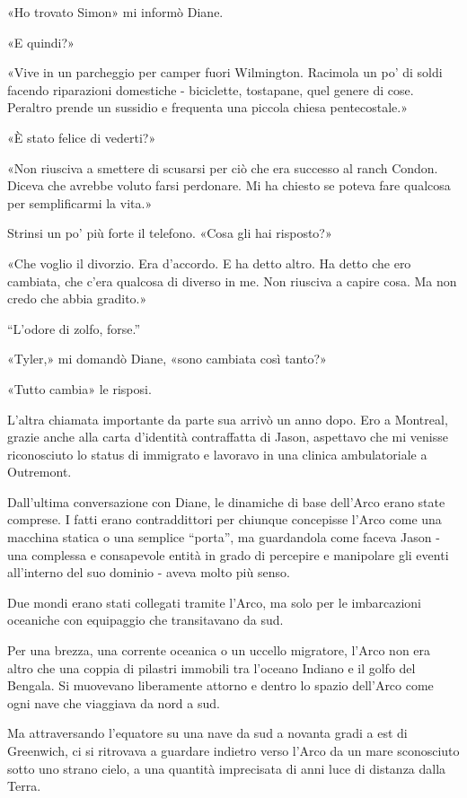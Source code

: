 «Ho trovato Simon» mi informò Diane.

«E quindi?»

«Vive in un parcheggio per camper fuori Wilmington. Racimola un po' di
soldi facendo riparazioni domestiche - biciclette, tostapane, quel
genere di cose. Peraltro prende un sussidio e frequenta una piccola
chiesa pentecostale.»

«È stato felice di vederti?»

«Non riusciva a smettere di scusarsi per ciò che era successo al ranch
Condon. Diceva che avrebbe voluto farsi perdonare. Mi ha chiesto se
poteva fare qualcosa per semplificarmi la vita.»

Strinsi un po' più forte il telefono. «Cosa gli hai risposto?»

«Che voglio il divorzio. Era d'accordo. E ha detto altro. Ha detto che
ero cambiata, che c'era qualcosa di diverso in me. Non riusciva a capire
cosa. Ma non credo che abbia gradito.»

``L'odore di zolfo, forse.''

«Tyler,» mi domandò Diane, «sono cambiata così tanto?»

«Tutto cambia» le risposi.

\separatorefiori

L'altra chiamata importante da parte sua arrivò un anno dopo. Ero a
Montreal, grazie anche alla carta d'identità contraffatta di Jason,
aspettavo che mi venisse riconosciuto lo status di immigrato e lavoravo
in una clinica ambulatoriale a Outremont.

Dall'ultima conversazione con Diane, le dinamiche di base dell'Arco
erano state comprese. I fatti erano contraddittori per chiunque
concepisse l'Arco come una macchina statica o una semplice ``porta'', ma
guardandola come faceva Jason - una complessa e consapevole entità in
grado di percepire e manipolare gli eventi all'interno del suo dominio -
aveva molto più senso.

Due mondi erano stati collegati tramite l'Arco, ma solo per le
imbarcazioni oceaniche con equipaggio che transitavano da sud.

Per una brezza, una corrente oceanica o un uccello migratore, l'Arco non
era altro che una coppia di pilastri immobili tra l'oceano Indiano e il
golfo del Bengala. Si muovevano liberamente attorno e dentro lo spazio
dell'Arco come ogni nave che viaggiava da nord a sud.

Ma attraversando l'equatore su una nave da sud a novanta gradi a est di
Greenwich, ci si ritrovava a guardare indietro verso l'Arco da un mare
sconosciuto sotto uno strano cielo, a una quantità imprecisata di anni
luce di distanza dalla Terra.

